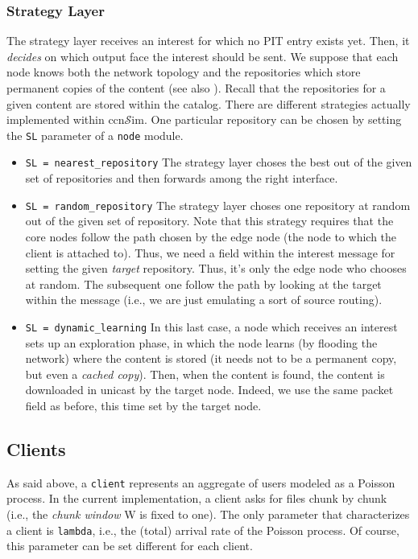 \documentclass{article}
\newcommand{\ccnsim}{ccn$\mathcal{S}$im}
\begin{document}
\subsubsection{Strategy Layer}
The strategy layer receives an interest for which no PIT entry exists yet. Then, it \emph{decides} on which output face the interest should be sent. We suppose that each node knows both the network topology and the repositories which store permanent copies of the content (see also ). Recall that the repositories for a given content are stored within the catalog. There are different strategies actually implemented within \ccnsim. One particular repository can be chosen by setting the \verb|SL| parameter of a \verb|node| module. 
\begin{itemize}
    \item \verb|SL = nearest_repository| The strategy layer choses the best out of the given set of repositories and then forwards among the right interface. 
    \item \verb|SL = random_repository|  The strategy layer choses one repository at random out of the given set of repository. Note that this strategy requires that the core nodes follow the path chosen by the edge node (the node to which the client is attached to). Thus, we need a field within the interest message for setting the given \emph{target} repository. Thus, it's only the edge node who chooses at random. The subsequent one follow the path by looking at the target within the message (i.e., we are just emulating a sort of source routing). 
    \item \verb|SL = dynamic_learning| In this last case, a node which receives an interest sets up an exploration phase, in which the node learns (by flooding the network) where the content is stored (it needs not to be a permanent copy, but even a \emph{cached copy}). Then, when the content is found, the content is downloaded in unicast by the target node. Indeed, we use the same packet field as before, this time set by the target node. 
\end{itemize}
\subsection{Clients}
As said above, a \verb|client| represents an aggregate of users modeled as a Poisson process. In the current implementation, a client asks for files chunk by chunk (i.e., the \emph{chunk window} W is fixed to one). The only parameter that characterizes a client is \verb|lambda|, i.e., the (total) arrival rate of the Poisson process. Of course, this parameter can be set different for each client. 
\end{document}

